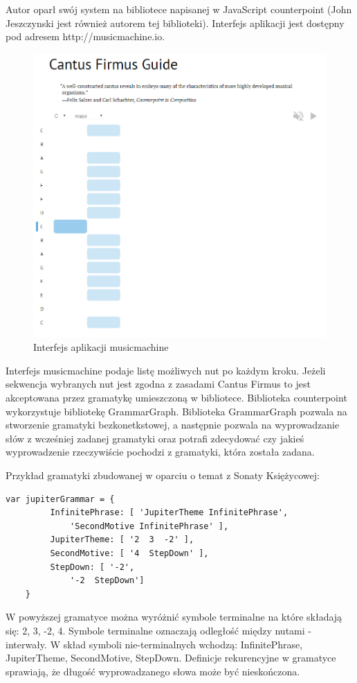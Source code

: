 Autor oparł swój system na bibliotece napisanej w JavaScript counterpoint (John Jeszczynski jest również autorem tej biblioteki). Interfejs aplikacji jest dostępny pod adresem http://musicmachine.io.


\begin{figure}[H]
	\centering
	\includegraphics[width=0.7\linewidth]{music_machine_gui}
	\caption{Interfejs aplikacji musicmachine}
	\label{fig:musicmachinegui}
\end{figure}

Interfejs musicmachine podaje listę możliwych nut po każdym kroku. Jeżeli sekwencja wybranych nut jest zgodna z zasadami Cantus Firmus to jest akceptowana przez gramatykę umieszczoną w bibliotece. Biblioteka counterpoint wykorzystuje bibliotekę GrammarGraph. Biblioteka GrammarGraph pozwala na stworzenie gramatyki bezkonetkstowej, a następnie pozwala na wyprowadzanie słów z wcześniej zadanej gramatyki oraz potrafi zdecydować czy jakieś wyprowadzenie rzeczywiście pochodzi z gramatyki, która została zadana.

\begin{przyklad}
	Przykład gramatyki zbudowanej w oparciu o temat z Sonaty Księżycowej:
	\begin{lstlisting}[caption={}, captionpos=b]
	var jupiterGrammar = {
	     InfinitePhrase: [ 'JupiterTheme InfinitePhrase',
	         'SecondMotive InfinitePhrase' ],
	     JupiterTheme: [ '2  3  -2' ],
	     SecondMotive: [ '4  StepDown' ],
	     StepDown: [ '-2',
	         '-2  StepDown']
	}
	\end{lstlisting}
	W powyższej gramatyce można wyróżnić symbole terminalne na które składają się: 2, 3, -2, 4. Symbole terminalne oznaczają odległość między nutami - interwały. W skład symboli nie-terminalnych wchodzą: InfinitePhrase, JupiterTheme, SecondMotive, StepDown. Definicje rekurencyjne w gramatyce sprawiają, że długość wyprowadzanego słowa może być nieskończona. 
	
\end{przyklad} 

